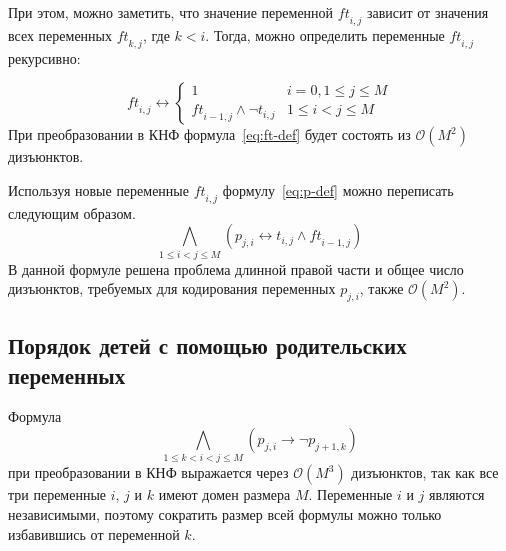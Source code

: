 При этом, можно заметить, что значение переменной $\mathit{ft}_{i,j}$ зависит от значения всех переменных $\mathit{ft}_{k,j}$, где $k < i$. Тогда, можно определить переменные $\mathit{ft}_{i,j}$ рекурсивно:

\begin{equation}
\label{eq:ft-def}
  \mathit{ft}_{i,j} \leftrightarrow 
    \begin{cases} 
      1                               & i = 0, 1 \leq j \leq M \\
      \mathit{ft}_{i-1,j} \wedge \neg t_{i,j}  & 1 \leq i < j \leq M
    \end{cases} 
\end{equation}
%
При преобразовании в КНФ формула~\eqref{eq:ft-def} будет состоять из $\mathcal{O}\left(M^{2}\right)$ дизъюнктов.

Используя новые переменные $\mathit{ft}_{i,j}$ формулу~\eqref{eq:p-def} можно переписать следующим образом.
%
\begin{equation}
\label{eq:p-def-tight}
  \bigwedge_{1 \leq i < j \leq M} \left(p_{j,i} \leftrightarrow t_{i,j} \wedge \mathit{ft}_{i-1,j}\right)
\end{equation}
%
В данной формуле решена проблема длинной правой части и общее число дизъюнктов, требуемых для кодирования переменных $p_{j,i}$, также $\mathcal{O}\left(M^{2}\right)$. 


\subsection{Порядок детей с помощью родительских переменных}
\label{sec:space:tight:p-order}


Формула $$\bigwedge_{1 \leq k < i < j \leq M} \left(p_{j,i} \rightarrow \neg p_{j + 1, k}\right)$$ при преобразовании в КНФ выражается через $\mathcal{O}\left(M^{3}\right)$ дизъюнктов, так как все три переменные $i$, $j$ и $k$ имеют домен размера $M$.
Переменные $i$ и $j$ являются независимыми, поэтому сократить размер всей формулы можно только избавившись от переменной $k$.

